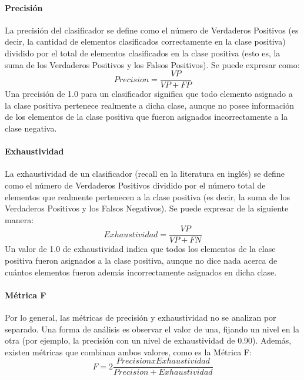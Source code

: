 \documentclass[a4paper,11pt,spanish]{book}
\begin{document}
	  \paragraph { Precisión }
	    La precisión del clasificador se define como el número de Verdaderos Positivos (es decir, la cantidad de elementos clasificados correctamente en la clase positiva)
	    dividido por el total de elementos clasificados en la clase positiva (esto es, la suma de los Verdaderos Positivos y los Falsos Positivos). Se puede expresar como:
	    \begin{equation}
	     Precision = {\frac {VP}{VP+FP}}
	    \end{equation}
	    Una precisión de 1.0 para un clasificador significa que todo elemento asignado a la clase positiva pertenece realmente a dicha clase, aunque no posee información
	    de los elementos de la clase positiva que fueron asignados incorrectamente a la clase negativa.
	  
	  \paragraph { Exhaustividad }  
	    La exhaustividad de un clasificador (recall en la literatura en inglés) se define como el número de Verdaderos Positivos dividido por el número total de elementos que 
	    realmente pertenecen a la clase positiva (es decir, la suma de los Verdaderos Positivos y los Falsos Negativos). Se puede expresar de la siguiente manera:
	    \begin{equation}
	     Exhaustividad = {\frac {VP}{VP+FN}}
	    \end{equation}
	    Un valor de 1.0 de exhaustividad indica que todos los elementos de la clase positiva fueron asignados a la clase positiva, aunque no dice nada acerca de cuántos elementos 
	    fueron además incorrectamente asignados en dicha clase.
	    
	  \paragraph { Métrica F }
	    Por lo general, las métricas de precisión y exhaustividad no se analizan por separado. Una forma de análisis es observar el valor de una, fijando un nivel en la otra 
	    (por ejemplo, la precisión con un nivel de exhaustividad de 0.90). Además, existen métricas que combinan ambos valores, como es la Métrica F:
	    \begin{equation}
	      F = 2 {\frac {Precision x Exhaustividad}{Precision + Exhaustividad}}
	    \end{equation}
\end{document}
